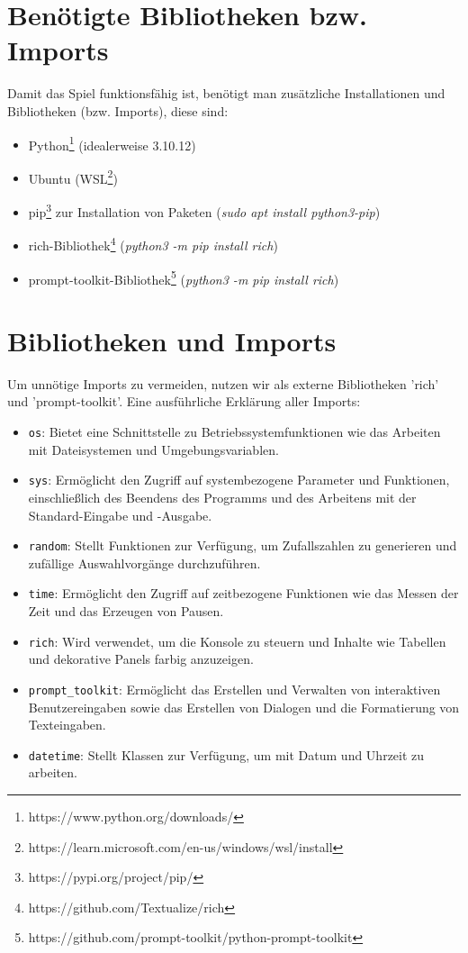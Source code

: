 \documentclass{llncs}
\begin{document}
\section{Benötigte Bibliotheken bzw. Imports}

Damit das Spiel funktionsfähig ist, benötigt man zusätzliche Installationen und Bibliotheken (bzw. Imports), diese sind: 
\begin{itemize} 
    \item Python\footnote{https://www.python.org/downloads/} (idealerweise 3.10.12)
    \item Ubuntu (WSL\footnote{https://learn.microsoft.com/en-us/windows/wsl/install})
    \item pip\footnote{https://pypi.org/project/pip/} zur Installation von Paketen (\textit{sudo apt install python3-pip})
    \item rich-Bibliothek\footnote{https://github.com/Textualize/rich} (\textit{python3 -m pip install rich})
    \item prompt-toolkit-Bibliothek\footnote{https://github.com/prompt-toolkit/python-prompt-toolkit} (\textit{python3 -m pip install rich})

\end{itemize}

\section{Bibliotheken und Imports}

Um unnötige Imports zu vermeiden, nutzen wir als externe Bibliotheken 'rich' und 'prompt-toolkit'. Eine ausführliche Erklärung aller Imports:

\begin{itemize}
    \item \texttt{os}: Bietet eine Schnittstelle zu Betriebssystemfunktionen wie das Arbeiten mit Dateisystemen und Umgebungsvariablen.
    \item \texttt{sys}: Ermöglicht den Zugriff auf systembezogene Parameter und Funktionen, einschließlich des Beendens des Programms und des Arbeitens mit der Standard-Eingabe und -Ausgabe.
    \item \texttt{random}: Stellt Funktionen zur Verfügung, um Zufallszahlen zu generieren und zufällige Auswahlvorgänge durchzuführen.
    \item \texttt{time}: Ermöglicht den Zugriff auf zeitbezogene Funktionen wie das Messen der Zeit und das Erzeugen von Pausen.
    \item \texttt{rich}: Wird verwendet, um die Konsole zu steuern und Inhalte wie Tabellen und dekorative Panels farbig anzuzeigen.
    \item \texttt{prompt\_toolkit}: Ermöglicht das Erstellen und Verwalten von interaktiven Benutzereingaben sowie das Erstellen von Dialogen und die Formatierung von Texteingaben.
    \item \texttt{datetime}: Stellt Klassen zur Verfügung, um mit Datum und Uhrzeit zu arbeiten.
\end{itemize}
\end{document}

